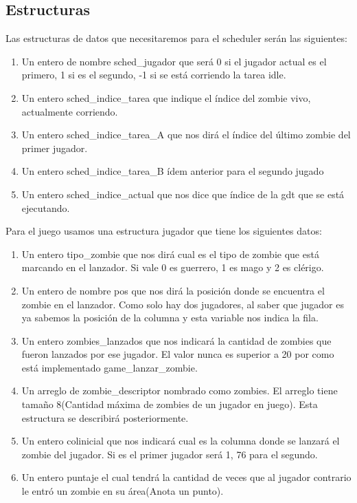 \documentclass[a4paper]{article}
\begin{document}
\subsection{Estructuras}

Las estructuras de datos que necesitaremos para el scheduler serán las siguientes:

\begin{enumerate}
\item  Un entero de nombre sched\_jugador que será 0 si el jugador actual es el primero, 1 si es el segundo, -1 si se está corriendo la tarea idle.

\item Un entero sched\_indice\_tarea que indique el índice del zombie vivo, actualmente corriendo.

\item Un entero sched\_indice\_tarea\_A que nos dirá el índice del último zombie del primer jugador.

\item Un entero sched\_indice\_tarea\_B ídem anterior para el segundo jugado

\item Un entero sched\_indice\_actual que nos dice que índice de la gdt que se está ejecutando.
\end{enumerate}

Para el juego usamos una estructura jugador que tiene los siguientes datos:

\begin{enumerate}
    \item  Un entero tipo\_zombie que nos dirá cual es el tipo de zombie que está marcando en el lanzador. Si vale 0 es guerrero, 1 es mago y 2 es clérigo.

    \item Un entero de nombre pos que nos dirá la posición donde se encuentra el zombie en el lanzador. Como solo hay dos jugadores, al saber que jugador es ya sabemos la posición de la columna y esta variable nos indica la fila. 

    \item Un entero zombies\_lanzados que nos indicará la cantidad de zombies que fueron lanzados por ese jugador. El valor nunca es superior a 20 por como está implementado game\_lanzar\_zombie. 

    \item Un arreglo de zombie\_descriptor nombrado como zombies. El arreglo tiene tamaño 8(Cantidad máxima de zombies de un jugador en juego). Esta estructura se describirá posteriormente.

    \item Un entero colinicial que nos indicará cual es la columna donde se lanzará el zombie del jugador. Si es el primer jugador será 1, 76 para el segundo.

    \item Un entero puntaje el cual tendrá la cantidad de veces que al jugador contrario le entró un zombie en su área(Anota un punto).
\end{enumerate}
\end{document}
